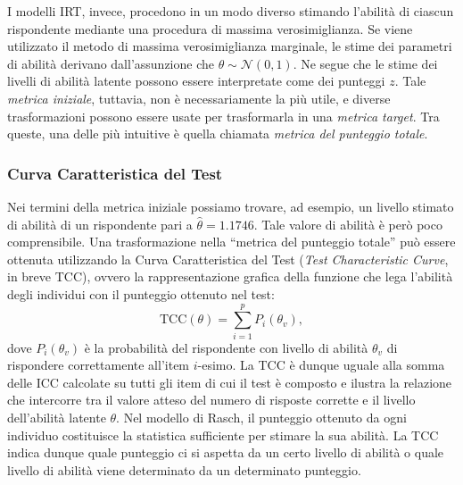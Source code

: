 I modelli IRT, invece, procedono in un modo diverso stimando l'abilità di ciascun rispondente mediante una procedura di massima verosimiglianza. Se viene utilizzato  il metodo di massima verosimiglianza marginale, le stime dei parametri di abilità derivano dall'assunzione che $\theta \sim \mathcal{N}(0, 1)$. Ne segue che le stime dei livelli di abilità latente possono essere interpretate come dei punteggi $z$. Tale \emph{metrica iniziale}, tuttavia, non è necessariamente la più utile, e diverse trasformazioni possono essere usate per trasformarla in una \emph{metrica target}. Tra queste, una delle più intuitive è quella chiamata \emph{metrica del punteggio totale}. 

\subsubsection{Curva Caratteristica del Test}

Nei termini della metrica iniziale possiamo trovare, ad esempio, un livello stimato di abilità di un rispondente pari a $\hat{\theta} = 1.1746$. Tale valore di abilità è però poco comprensibile.  Una trasformazione nella ``metrica del punteggio totale'' può essere ottenuta utilizzando la Curva Caratteristica del Test (\emph{Test Characteristic Curve}, in breve TCC), ovvero la rappresentazione grafica della funzione che lega l'abilità degli individui con il punteggio ottenuto nel test:
\begin{equation}
\text{TCC}(\theta) = \sum_{i=1}^p P_i(\theta_v),
\end{equation}
dove $P_i(\theta_v)$ è la probabilità del rispondente con livello di abilità $\theta_v$ di rispondere correttamente all'item $i$-esimo. La TCC è dunque uguale alla somma delle ICC calcolate su tutti gli item di cui il test è composto e ilustra la relazione che intercorre tra il valore atteso del numero di risposte corrette e il livello dell'abilità latente $\theta$. Nel modello di Rasch, il punteggio ottenuto da ogni individuo costituisce la statistica sufficiente per stimare la sua abilità. La TCC indica dunque quale punteggio ci si aspetta da un certo livello di abilità o quale livello di abilità viene determinato da un determinato punteggio. 



